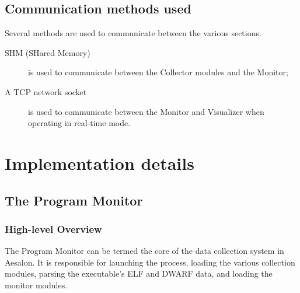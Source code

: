 \documentclass[a4paper,10pt]{report}
\begin{document}
\section{Communication methods used}
Several methods are used to communicate between the various sections.
\flushleft
\begin{description}
 \item[SHM (SHared Memory)] is used to communicate between the Collector modules and the Monitor;
 \item[\textnormal{A} TCP network socket] is used to communicate between the Monitor and Visualizer when operating in
  real-time mode.
\end{description}

\chapter{Implementation details}
\section{The Program Monitor}
\subsection{High-level Overview}
The Program Monitor can be termed the core of the data collection system in Aesalon. It is responsible for
launching the process, loading the various collection modules, parsing the executable's ELF and DWARF data,
and loading the monitor modules.
\end{document}

